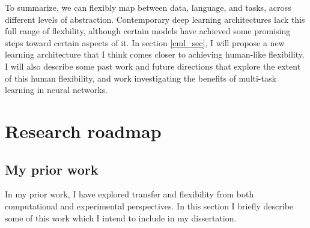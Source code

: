 \documentclass[11pt]{article}
\begin{document}
To summarize, we can flexibly map between data, language, and tasks, across different levels of abstraction. Contemporary deep learning architectures lack this full range of flexbility, although certain models have achieved some promising steps toward certain aspects of it. In section \ref{eml_sec}, I will propose a new learning architecture that I think comes closer to achieving human-like flexibility. I will also describe some past work and future directions that explore the extent of this human flexibility, and work investigating the benefits of multi-task learning in neural networks. \par 

\section{Research roadmap}

\subsection{My prior work}
In my prior work, I have explored transfer and flexibility from both computational and experimental perspectives. In this section I briefly describe some of this work which I intend to include in my dissertation. \par
\end{document}
